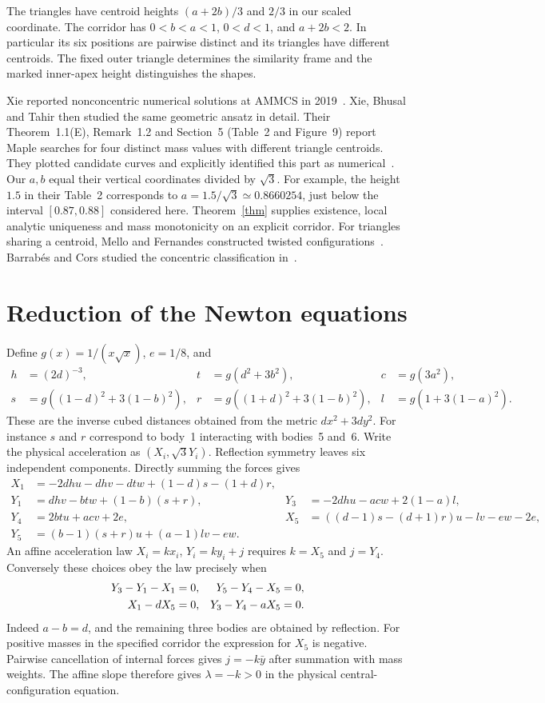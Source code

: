 \documentclass[10pt]{article}
\begin{document}
The triangles have centroid heights $(a+2b)/3$ and $2/3$ in our scaled coordinate. The corridor has $0<b<a<1$, $0<d<1$, and $a+2b<2$. In particular its six positions are pairwise distinct and its triangles have different centroids. The fixed outer triangle determines the similarity frame and the marked inner-apex height distinguishes the shapes.

Xie reported nonconcentric numerical solutions at AMMCS in 2019~\cite[p.~379]{xie2019}. Xie, Bhusal and Tahir then studied the same geometric ansatz in detail. Their Theorem~1.1(E), Remark~1.2 and Section~5 (Table~2 and Figure~9) report Maple searches for four distinct mass values with different triangle centroids. They plotted candidate curves and explicitly identified this part as numerical~\cite{xie}. Our $a,b$ equal their vertical coordinates divided by $\sqrt3$. For example, the height $1.5$ in their Table~2 corresponds to $a=1.5/\sqrt3\simeq0.8660254$, just below the interval $[0.87,0.88]$ considered here. Theorem~\ref{thm} supplies existence, local analytic uniqueness and mass monotonicity on an explicit corridor. For triangles sharing a centroid, Mello and Fernandes constructed twisted configurations~\cite{mello}. Barrab\'es and Cors studied the concentric classification in~\cite{crowns}.

\section{Reduction of the Newton equations}
Define $g(x)=1/(x\sqrt{x})$, $e=1/8$, and
\begin{align*}
h&=(2d)^{-3}, &t&=g(d^2+3b^2),&c&=g(3a^2),\\
s&=g((1-d)^2+3(1-b)^2),&
r&=g((1+d)^2+3(1-b)^2),&
l&=g(1+3(1-a)^2).
\end{align*}
These are the inverse cubed distances obtained from the metric $dx^2+3dy^2$. For instance $s$ and $r$ correspond to body~1 interacting with bodies~5 and~6. Write the physical acceleration as $(X_i,\sqrt3 Y_i)$. Reflection symmetry leaves six independent components. Directly summing the forces gives
\begin{align*}
X_1&=-2dhu-dhv-dtw+(1-d)s-(1+d)r,\\
Y_1&=dhv-btw+(1-b)(s+r),&
Y_3&=-2dhu-acw+2(1-a)l,\\
Y_4&=2btu+acv+2e,&
X_5&=((d-1)s-(d+1)r)u-lv-ew-2e,\\
Y_5&=(b-1)(s+r)u+(a-1)lv-ew .
\end{align*}
An affine acceleration law $X_i=k x_i$, $Y_i=k y_i+j$ requires $k=X_5$ and $j=Y_4$. Conversely these choices obey the law precisely when
\begin{align}
Y_3-Y_1-X_1&=0,&Y_5-Y_4-X_5&=0,\notag\\
X_1-dX_5&=0,&Y_3-Y_4-aX_5&=0.\label{eq:four}
\end{align}
Indeed $a-b=d$, and the remaining three bodies are obtained by reflection. For positive masses in the specified corridor the expression for $X_5$ is negative. Pairwise cancellation of internal forces gives $j=-k\bar y$ after summation with mass weights. The affine slope therefore gives $\lambda=-k>0$ in the physical central-configuration equation.
\end{document}
